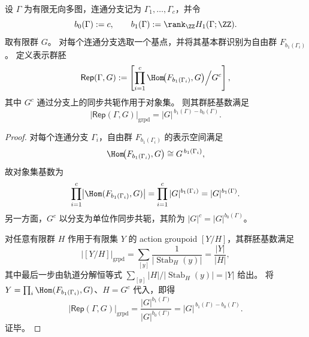 \begin{theorem}\label{thm:spg-boundary-gauge-groupoid-circle-law}
设 \(\Gamma\) 为有限无向多图，连通分支记为 \(\Gamma_1,\dots,\Gamma_c\)，并令
\[
b_0(\Gamma):=c,
\qquad
b_1(\Gamma):=\rank_{\ZZ}H_1(\Gamma;\ZZ).
\]
取有限群 \(G\)。
对每个连通分支选取一个基点，并将其基本群识别为自由群 \(F_{b_1(\Gamma_i)}\)。
定义表示群胚
\[
\mathsf{Rep}(\Gamma,G)
:=
\left[
\prod_{i=1}^{c}\Hom\!\bigl(F_{b_1(\Gamma_i)},G\bigr)
\Big/
G^{c}
\right],
\]
其中 \(G^c\) 通过分支上的同步共轭作用于对象集。
则其群胚基数满足
\[
\bigl|\mathsf{Rep}(\Gamma,G)\bigr|_{\mathrm{grpd}}
=
|G|^{\,b_1(\Gamma)-b_0(\Gamma)}.
\]
\end{theorem}
\begin{proof}
对每个连通分支 \(\Gamma_i\)，自由群 \(F_{b_1(\Gamma_i)}\) 的表示空间满足
\[
\Hom\!\bigl(F_{b_1(\Gamma_i)},G\bigr)\cong G^{\,b_1(\Gamma_i)},
\]
故对象集基数为
\[
\prod_{i=1}^{c}\bigl|\Hom(F_{b_1(\Gamma_i)},G)\bigr|
=
\prod_{i=1}^{c}|G|^{b_1(\Gamma_i)}
=
|G|^{b_1(\Gamma)}.
\]
另一方面，\(G^c\) 以分支为单位作同步共轭，其阶为 \(|G|^c=|G|^{b_0(\Gamma)}\)。

对任意有限群 \(H\) 作用于有限集 \(Y\) 的 action groupoid \([Y/H]\)，其群胚基数满足
\[
|[Y/H]|_{\mathrm{grpd}}
=
\sum_{[y]}\frac{1}{|\operatorname{Stab}_H(y)|}
=
\frac{|Y|}{|H|},
\]
其中最后一步由轨道分解恒等式
\(
\sum_{[y]}|H|/|\operatorname{Stab}_H(y)|=|Y|
\)
给出。
将 \(Y=\prod_i\Hom(F_{b_1(\Gamma_i)},G)\)、\(H=G^c\) 代入，即得
\[
\bigl|\mathsf{Rep}(\Gamma,G)\bigr|_{\mathrm{grpd}}
=
\frac{|G|^{b_1(\Gamma)}}{|G|^{b_0(\Gamma)}}
=
|G|^{\,b_1(\Gamma)-b_0(\Gamma)}.
\]
证毕。
\end{proof}

